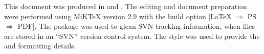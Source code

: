 
This document was produced in \LaTeXx and \Biberx.
The editing and document preparation were performed using MiK\TeX{} version 2.9  with the build option $[$\LaTeX{}  $\Rightarrow$ PS $\Rightarrow$ PDF$]$.
The  package was used to glean SVN tracking information, when files are stored in an ``SVN'' version control system.
The style {\tt \KNEADdocumentClsName}
was used to provide the \LaTeXx and \Biberx formatting details.